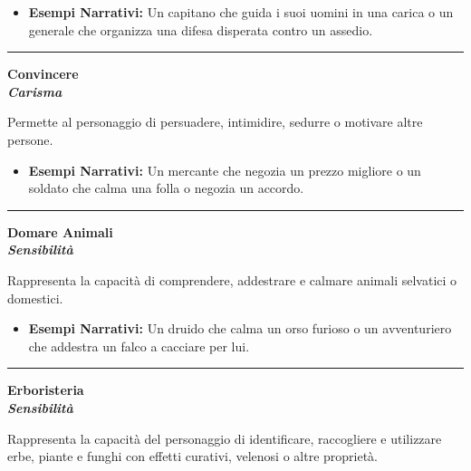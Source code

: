 \documentclass[../manuale_main.tex]{subfiles}
\begin{document}
\begin{itemize}
\item \textbf{Esempi Narrativi:} Un capitano che guida i suoi uomini in una carica o un generale che organizza una difesa disperata contro un assedio.
\end{itemize}

\vspace{0.5cm}\rule{\textwidth}{0.4pt}\vspace{0.5cm}

\begin{center}
\textbf{\large{Convincere}}\\ \textit{\textbf{Carisma}}\\
\end{center}
Permette al personaggio di persuadere, intimidire, sedurre o motivare altre persone.

\begin{itemize}
\item \textbf{Esempi Narrativi:} Un mercante che negozia un prezzo migliore o un soldato che calma una folla o negozia un accordo.
\end{itemize}

\vspace{0.5cm}\rule{\textwidth}{0.4pt}\vspace{0.5cm}

\begin{center}
\textbf{\large{Domare Animali}}\\ \textit{\textbf{Sensibilità}}\\
\end{center}
Rappresenta la capacità di comprendere, addestrare e calmare animali selvatici o domestici.

\begin{itemize}
\item \textbf{Esempi Narrativi:} Un druido che calma un orso furioso o un avventuriero che addestra un falco a cacciare per lui.
\end{itemize}

\vspace{0.5cm}\rule{\textwidth}{0.4pt}\vspace{0.5cm}

\begin{center}
\textbf{\large{Erboristeria}}\\ \textit{\textbf{Sensibilità}}\\
\end{center}
Rappresenta la capacità del personaggio di identificare, raccogliere e utilizzare erbe, piante e funghi con effetti curativi, velenosi o altre proprietà.
\end{document}
